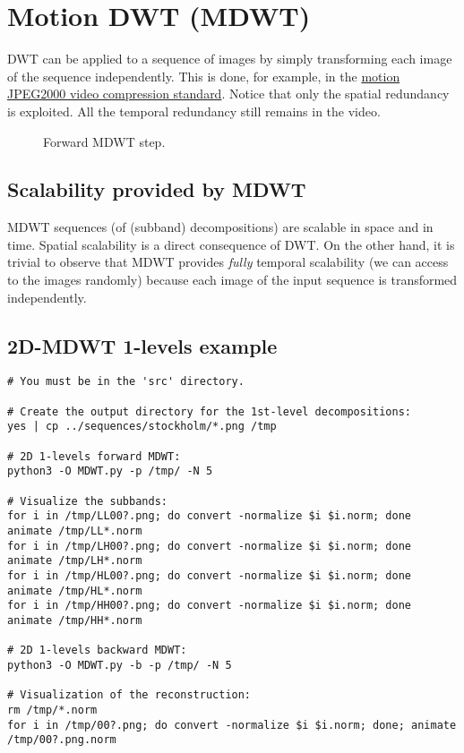 \section{Motion DWT (MDWT)}

DWT can be applied to a sequence of images by simply transforming each
image of the sequence independently. This is done, for example, in the
\href{https://en.wikipedia.org/wiki/JPEG_2000}{motion JPEG2000 video
  compression standard}. Notice that only the spatial redundancy is
exploited. All the temporal redundancy still remains in the video.

\begin{figure}
  \centering %
  \caption{Forward MDWT step.} %
  \label{fig:forward_DWT_step}
\end{figure}



\subsection{Scalability provided by MDWT}
MDWT sequences (of (subband) decompositions) are scalable in space and
in time. Spatial scalability is a direct consequence of DWT. On the other
hand, it is trivial to observe that MDWT provides \emph{fully}
temporal scalability (we can access to the images randomly) because
each image of the input sequence is transformed independently.

\subsection{2D-MDWT 1-levels example}
\begin{verbatim}
# You must be in the 'src' directory.

# Create the output directory for the 1st-level decompositions:
yes | cp ../sequences/stockholm/*.png /tmp

# 2D 1-levels forward MDWT:
python3 -O MDWT.py -p /tmp/ -N 5

# Visualize the subbands:
for i in /tmp/LL00?.png; do convert -normalize $i $i.norm; done
animate /tmp/LL*.norm
for i in /tmp/LH00?.png; do convert -normalize $i $i.norm; done
animate /tmp/LH*.norm
for i in /tmp/HL00?.png; do convert -normalize $i $i.norm; done
animate /tmp/HL*.norm
for i in /tmp/HH00?.png; do convert -normalize $i $i.norm; done
animate /tmp/HH*.norm

# 2D 1-levels backward MDWT:
python3 -O MDWT.py -b -p /tmp/ -N 5

# Visualization of the reconstruction:
rm /tmp/*.norm
for i in /tmp/00?.png; do convert -normalize $i $i.norm; done; animate /tmp/00?.png.norm
\end{verbatim}

